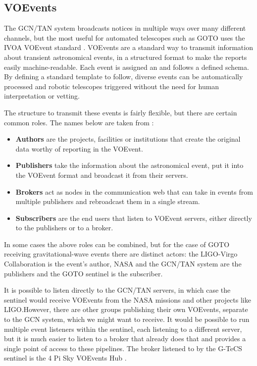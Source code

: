 \subsection{VOEvents}
\label{sec:voevents}
\begin{colsection}

The GCN/TAN system broadcasts notices in multiple ways over many different channels, but the most useful for automated telescopes such as GOTO uses the IVOA VOEvent standard \citep{voevent}. VOEvents are a standard way to transmit information about transient astronomical events, in a structured format to make the reports easily machine-readable. Each event is assigned an  and follows a defined schema. By defining a standard template to follow, diverse events can be automatically processed and robotic telescopes triggered without the need for human interpretation or vetting.

The structure to transmit these events is fairly flexible, but there are certain common roles. The names below are taken from \citet{voevent}:

\begin{itemize}
    \item \textbf{Authors} are the projects, facilities or institutions that create the original data worthy of reporting in the VOEvent.
    \item \textbf{Publishers} take the information about the astronomical event, put it into the VOEvent format and broadcast it from their servers.
    \item \textbf{Brokers} act as nodes in the communication web that can take in events from multiple publishers and rebroadcast them in a single stream.
    \item \textbf{Subscribers} are the end users that listen to VOEvent servers, either directly to the publishers or to a broker.
\end{itemize}

In some cases the above roles can be combined, but for the case of GOTO receiving gravitational-wave events there are distinct actors: the LIGO-Virgo Collaboration is the event's author, NASA and the GCN/TAN system are the publishers and the GOTO sentinel is the subscriber.

It is possible to listen directly to the GCN/TAN servers, in which case the sentinel would receive VOEvents from the NASA missions and other projects like LIGO.\@ However, there are other groups publishing their own VOEvents, separate to the GCN system, which we might want to receive. It would be possible to run multiple event listeners within the sentinel, each listening to a different server, but it is much easier to listen to a broker that already does that and provides a single point of access to these pipelines. The broker listened to by the G-TeCS sentinel is the 4 Pi Sky VOEvents Hub \citep{4pisky}.


\end{colsection}
